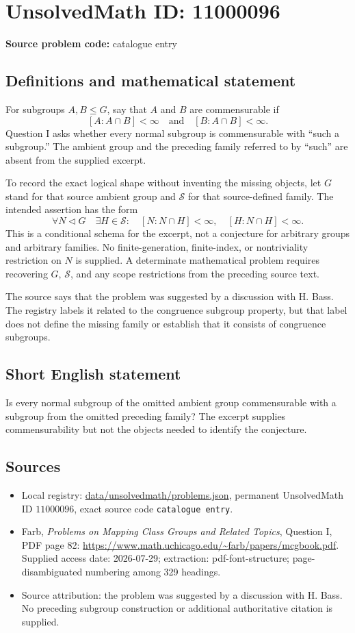 \documentclass[11pt]{article}
\begin{document}
\section*{UnsolvedMath ID: 11000096}
\textbf{Source problem code:} catalogue entry
\subsection{Definitions and mathematical statement}
For subgroups $A,B\leq G$, say that $A$ and $B$ are commensurable if
\[
 [A:A\cap B]<\infty\quad\text{and}\quad[B:A\cap B]<\infty.
\]
Question I asks whether every normal subgroup is commensurable with ``such a subgroup.'' The ambient group and the preceding family referred to by ``such'' are absent from the supplied excerpt.

To record the exact logical shape without inventing the missing objects, let $G$ stand for that source ambient group and $\mathcal S$ for that source-defined family. The intended assertion has the form
\[
 \forall N\triangleleft G\quad\exists H\in\mathcal S:\quad
 [N:N\cap H]<\infty,\quad[H:N\cap H]<\infty.
\]
This is a conditional schema for the excerpt, not a conjecture for arbitrary groups and arbitrary families. No finite-generation, finite-index, or nontriviality restriction on $N$ is supplied. A determinate mathematical problem requires recovering $G$, $\mathcal S$, and any scope restrictions from the preceding source text.

The source says that the problem was suggested by a discussion with H. Bass. The registry labels it related to the congruence subgroup property, but that label does not define the missing family or establish that it consists of congruence subgroups.
\subsection{Short English statement}
Is every normal subgroup of the omitted ambient group commensurable with a subgroup from the omitted preceding family? The excerpt supplies commensurability but not the objects needed to identify the conjecture.
\subsection{Sources}
\begin{itemize}
\item Local registry: \url{data/unsolvedmath/problems.json}, permanent UnsolvedMath ID $11000096$, exact source code \texttt{catalogue entry}.
\item Farb, \emph{Problems on Mapping Class Groups and Related Topics}, Question I, PDF page 82: \url{https://www.math.uchicago.edu/~farb/papers/mcgbook.pdf}. Supplied access date: 2026-07-29; extraction: pdf-font-structure; page-disambiguated numbering among 329 headings.
\item Source attribution: the problem was suggested by a discussion with H. Bass. No preceding subgroup construction or additional authoritative citation is supplied.
\end{itemize}
\end{document}
